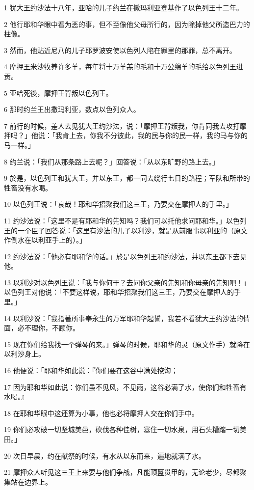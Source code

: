 \par 1 犹大王约沙法十八年，亚哈的儿子约兰在撒玛利亚登基作了以色列王十二年。
\par 2 他行耶和华眼中看为恶的事，但不至像他父母所行的，因为除掉他父所造巴力的柱像。
\par 3 然而，他贴近尼八的儿子耶罗波安使以色列人陷在罪里的那罪，总不离开。
\par 4 摩押王米沙牧养许多羊，每年将十万羊羔的毛和十万公绵羊的毛给以色列王进贡。
\par 5 亚哈死後，摩押王背叛以色列王。
\par 6 那时约兰王出撒玛利亚，数点以色列众人。
\par 7 前行的时候，差人去见犹大王约沙法，说：「摩押王背叛我，你肯同我去攻打摩押吗？」他说：「我肯上去，你我不分彼此，我的民与你的民一样，我的马与你的马一样。」
\par 8 约兰说：「我们从那条路上去呢？」回答说：「从以东旷野的路上去。」
\par 9 於是，以色列王和犹大王，并以东王，都一同去绕行七日的路程；军队和所带的牲畜没有水喝。
\par 10 以色列王说：「哀哉！耶和华招聚我们这三王，乃要交在摩押人的手里。」
\par 11 约沙法说：「这里不是有耶和华的先知吗？我们可以托他求问耶和华。」以色列王的一个臣子回答说：「这里有沙法的儿子以利沙，就是从前服事以利亚的（原文作倒水在以利亚手上的）。」
\par 12 约沙法说：「他必有耶和华的话。」於是以色列王和约沙法，并以东王都下去见他。
\par 13 以利沙对以色列王说：「我与你何干？去问你父亲的先知和你母亲的先知吧！」以色列王对他说：「不要这样说，耶和华招聚我们这三王，乃要交在摩押人的手里。」
\par 14 以利沙说：「我指著所事奉永生的万军耶和华起誓，我若不看犹大王约沙法的情面，必不理你，不顾你。
\par 15 现在你们给我找一个弹琴的来。」弹琴的时候，耶和华的灵（原文作手）就降在以利沙身上。
\par 16 他便说：「耶和华如此说：『你们要在这谷中满处挖沟；
\par 17 因为耶和华如此说：你们虽不见风，不见雨，这谷必满了水，使你们和牲畜有水喝。』
\par 18 在耶和华眼中这还算为小事，他也必将摩押人交在你们手中。
\par 19 你们必攻破一切坚城美邑，砍伐各种佳树，塞住一切水泉，用石头糟踏一切美田。」
\par 20 次日早晨，约在献祭的时候，有水从以东而来，遍地就满了水。
\par 21 摩押众人听见这三王上来要与他们争战，凡能顶盔贯甲的，无论老少，尽都聚集站在边界上。
